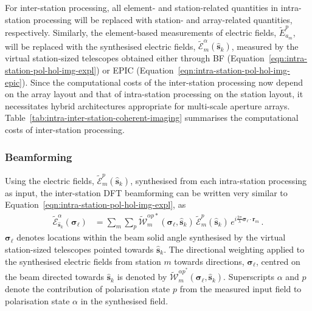 \documentclass[
  journal=pasa,
  manuscript=article-type,
  year=2020,
  volume=37,
]{cup-journal}
\begin{document}
For inter-station processing, all element- and station-related quantities in intra-station processing will be replaced with station- and array-related quantities, respectively. Similarly, the element-based measurements of electric fields, $\widetilde{E}_{a_m}^p$, will be replaced with the synthesised electric fields, $\widetilde{\mathcal{E}}_m^\alpha(\hat{\boldsymbol{s}}_k)$, measured by the virtual station-sized telescopes obtained either through BF (Equation~\ref{eqn:intra-station-pol-hol-img-expl}) or EPIC (Equation~\ref{eqn:intra-station-pol-hol-img-epic}).
Since the computational costs of the inter-station processing now depend on the array layout and that of intra-station processing on the station layout, it necessitates hybrid architectures appropriate for multi-scale aperture arrays. Table~\ref{tab:intra-inter-station-coherent-imaging} summarises the computational costs of inter-station processing.

\subsubsection{Beamforming}

Using the electric fields, $\widetilde{\mathcal{E}}_m^p(\hat{\boldsymbol{s}}_k)$, synthesised from each intra-station processing as input, the inter-station DFT beamforming 
can be written very similar to Equation~\ref{eqn:intra-station-pol-hol-img-expl}, as
\begin{align}
    \widetilde{\mathcal{E}}_{\hat{\boldsymbol{s}}_k}^\alpha(\boldsymbol{\sigma}_\ell) &= \sum_{m} \sum_p  \widetilde{\mathcal{W}}_{m}^{\alpha p *}(\boldsymbol{\sigma}_\ell,\hat{\boldsymbol{s}}_k) \, \widetilde{\mathcal{E}}_m^p(\hat{\boldsymbol{s}}_k) \, e^{i\frac{2\pi}{\lambda} \boldsymbol{\sigma}_\ell\cdot\boldsymbol{r}_{m}} \, . \label{eqn:inter-station-pol-hol-img-expl}   
\end{align}
$\boldsymbol{\sigma}_\ell$ denotes locations within the beam solid angle synthesised by the virtual station-sized telescopes pointed towards $\hat{\boldsymbol{s}}_k$. The directional weighting applied to the synthesised electric fields from station $m$ towards directions, $\boldsymbol{\sigma}_\ell$, centred on the beam directed towards $\hat{\boldsymbol{s}}_k$ is denoted by $\widetilde{\mathcal{W}}_{m}^{{\alpha p}^*}(\boldsymbol{\sigma}_\ell,\hat{\boldsymbol{s}}_k)$. Superscripts $\alpha$ and $p$ denote the contribution of polarisation state $p$ from the measured input field to polarisation state $\alpha$ in the synthesised field.
\end{document}
